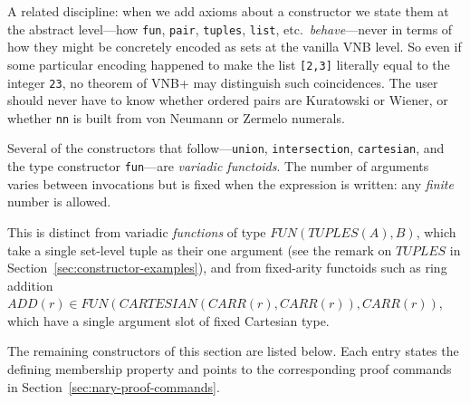\begin{remark}
A related discipline: when we add axioms about a constructor we state
them at the abstract level---how \texttt{fun}, \texttt{pair},
\texttt{tuples}, \texttt{list}, etc.\ \emph{behave}---never in terms
of how they might be concretely encoded as sets at the vanilla VNB
level.  So even if some particular encoding happened to make the list
\texttt{[2,3]} literally equal to the integer \texttt{23}, no theorem
of VNB+ may distinguish such coincidences.  The user should never
have to know whether ordered pairs are Kuratowski or Wiener, or
whether \texttt{nn} is built from von Neumann or Zermelo numerals.
\end{remark}

\begin{remark}
Several of the constructors that follow---\texttt{union},
\texttt{intersection}, \texttt{cartesian}, and the type constructor
\texttt{fun}---are \emph{variadic functoids}.  The number of arguments
varies between invocations but is fixed when the expression is written:
any \emph{finite} number is allowed.

This is distinct from variadic \emph{functions} of type
$\mathit{FUN}(\mathit{TUPLES}(A), B)$, which take a single set-level
tuple as their one argument (see the remark on $\mathit{TUPLES}$ in
Section~\ref{sec:constructor-examples}), and from fixed-arity functoids
such as ring addition
$\mathit{ADD}(r) \in \mathit{FUN}(\mathit{CARTESIAN}(CARR(r), CARR(r)), CARR(r))$,
which have a single argument slot of fixed Cartesian type.
\end{remark}

\medskip\noindent The remaining constructors of this section are listed
below.  Each entry states the defining membership property and points to
the corresponding proof commands in
Section~\ref{sec:nary-proof-commands}.

